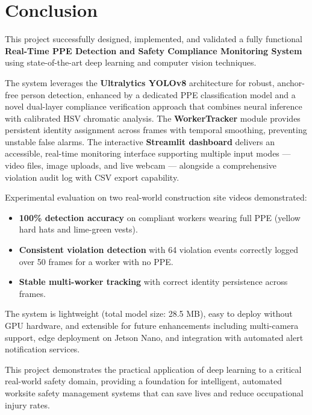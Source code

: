 \documentclass[12pt,a4paper]{report}
\begin{document}
\chapter{Conclusion}

This project successfully designed, implemented, and validated a fully functional \textbf{Real-Time PPE Detection and Safety Compliance Monitoring System} using state-of-the-art deep learning and computer vision techniques.

The system leverages the \textbf{Ultralytics YOLOv8} architecture for robust, anchor-free person detection, enhanced by a dedicated PPE classification model and a novel dual-layer compliance verification approach that combines neural inference with calibrated HSV chromatic analysis. The \textbf{WorkerTracker} module provides persistent identity assignment across frames with temporal smoothing, preventing unstable false alarms. The interactive \textbf{Streamlit dashboard} delivers an accessible, real-time monitoring interface supporting multiple input modes — video files, image uploads, and live webcam — alongside a comprehensive violation audit log with CSV export capability.

Experimental evaluation on two real-world construction site videos demonstrated:
\begin{itemize}
    \item \textbf{100\% detection accuracy} on compliant workers wearing full PPE (yellow hard hats and lime-green vests).
    \item \textbf{Consistent violation detection} with 64 violation events correctly logged over 50 frames for a worker with no PPE.
    \item \textbf{Stable multi-worker tracking} with correct identity persistence across frames.
\end{itemize}

The system is lightweight (total model size: 28.5 MB), easy to deploy without GPU hardware, and extensible for future enhancements including multi-camera support, edge deployment on Jetson Nano, and integration with automated alert notification services.

This project demonstrates the practical application of deep learning to a critical real-world safety domain, providing a foundation for intelligent, automated worksite safety management systems that can save lives and reduce occupational injury rates.
\end{document}
